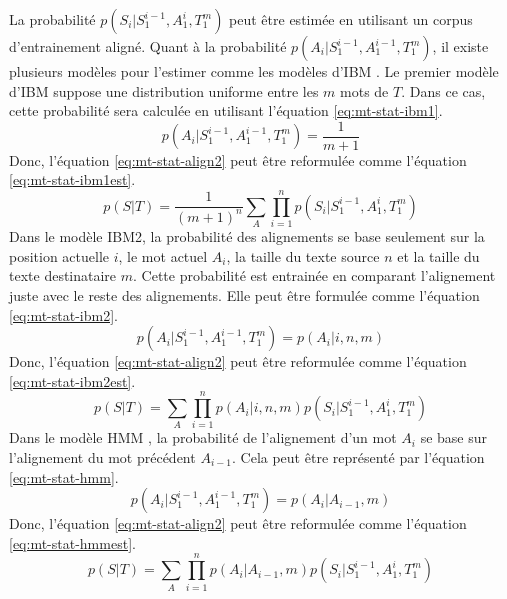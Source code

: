 \documentclass{KodeBook}
\begin{document}
La probabilité $p(S_i | S_1^{i-1}, A_1^{i}, T_1^{m})$ peut être estimée en utilisant un corpus d'entrainement aligné. 
Quant à la probabilité $p(A_i | S_1^{i-1}, A_1^{i-1}, T_1^{m})$, il existe plusieurs modèles pour l'estimer comme les modèles d'IBM \cite{1993-brown-al}.
Le premier modèle d'IBM suppose une distribution uniforme entre les $m$ mots de $T$. 
Dans ce cas, cette probabilité sera calculée en utilisant l'équation \ref{eq:mt-stat-ibm1}. 
\begin{equation}\label{eq:mt-stat-ibm1}
p(A_i | S_1^{i-1}, A_1^{i-1}, T_1^{m}) = \frac{1}{m+1}
\end{equation}
Donc, l'équation \ref{eq:mt-stat-align2} peut être reformulée comme l'équation \ref{eq:mt-stat-ibm1est}.
\begin{equation}\label{eq:mt-stat-ibm1est}
p(S|T) = \frac{1}{(m+1)^n} \sum_{A} \prod_{i=1}^{n} p(S_i | S_1^{i-1}, A_1^{i}, T_1^{m})
\end{equation}
Dans le modèle IBM2, la probabilité des alignements se base seulement sur la position actuelle $i$, le mot actuel $A_i$, la taille du texte source $n$ et la taille du texte destinataire $m$. 
Cette probabilité est entrainée en comparant l'alignement juste avec le reste des alignements.
Elle peut être formulée comme l'équation \ref{eq:mt-stat-ibm2}.
\begin{equation}\label{eq:mt-stat-ibm2}
p(A_i | S_1^{i-1}, A_1^{i-1}, T_1^{m}) = p(A_i | i, n, m)
\end{equation}
Donc, l'équation \ref{eq:mt-stat-align2} peut être reformulée comme l'équation \ref{eq:mt-stat-ibm2est}.
\begin{equation}\label{eq:mt-stat-ibm2est}
p(S|T) = \sum_{A} \prod_{i=1}^{n} p(A_i | i, n, m) p(S_i | S_1^{i-1}, A_1^{i}, T_1^{m})
\end{equation}
Dans le modèle HMM \cite{96-vogel-al}, la probabilité de l'alignement d'un mot $A_i$ se base sur l'alignement du mot précédent $A_{i-1}$.
Cela peut être représenté par l'équation \ref{eq:mt-stat-hmm}.
\begin{equation}\label{eq:mt-stat-hmm}
p(A_i | S_1^{i-1}, A_1^{i-1}, T_1^{m}) = p(A_i | A_{i-1}, m)
\end{equation}
Donc, l'équation \ref{eq:mt-stat-align2} peut être reformulée comme l'équation \ref{eq:mt-stat-hmmest}.
\begin{equation}\label{eq:mt-stat-hmmest}
p(S|T) = \sum_{A} \prod_{i=1}^{n} p(A_i | A_{i-1}, m) p(S_i | S_1^{i-1}, A_1^{i}, T_1^{m})
\end{equation}
\end{document}
